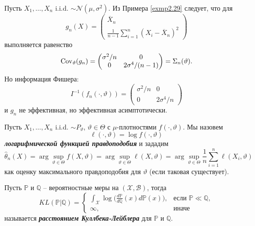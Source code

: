 \begin{exmp}
	Пусть $X_1, \dots, X_n$ i.i.d. $\sim \mathcal{N}(\mu, \sigma^2)$. Из Примера \ref{exmp2.29} следует, что для
	\[ g_n(X) = \begin{pmatrix}
	\overline{X}_n \\
	\frac{1}{n-1} \sum_{i=1}^{n} (X_i - \overline{X}_n)^2
	\end{pmatrix}  \]
	выполняется равенство
	\[ \mathrm{Cov}_\vartheta(g_n) = \begin{pmatrix}
	\sigma^2/n & 0 \\
	0 & 2\sigma^4 / (n - 1)
	\end{pmatrix}  
	= \Sigma_n(\vartheta). \]
	Но информация Фишера:
	\[ I^{-1}(f_n(\cdot, \vartheta)) = \begin{pmatrix}
	\sigma^2/n & 0 \\
	0 & 2\sigma^4 / n
	\end{pmatrix}   \]
	и $g_n$ не эффективная, но эффективная асимптотически.
\end{exmp}

\begin{rmrk}
	Пусть $X_1, \dots, X_n$ i.i.d. $\sim P_\vartheta$, $\vartheta \in \Theta$ с $\mu$-плотностями $f(\cdot, \vartheta)$. Мы назовем
	\[ \ell(\cdot, \vartheta) = \log f(\cdot, \vartheta)  \] 
	\textbf{\textit{логарифмической функцией правдоподобия}} и зададим
	\[ \hat{\theta}_n(X) = \arg \sup_{\vartheta \in \Theta} f(X, \vartheta) = \arg \sup_{\vartheta \in \Theta} \ell (X, \vartheta) = \arg \sup_{\vartheta \in \Theta} \frac{1}{n} \sum_{i=1}^{n} \ell (X_i, \vartheta) \]
	как оценку максимального правдоподобия для $\vartheta$ (если таковая существует).
\end{rmrk}

\begin{defn}
	Пусть $\mathbb{P}$ и $\mathbb{Q}$ -- вероятностные меры на $(\mathcal{X}, \mathcal{B})$, тогда
	\[ KL(\mathbb{P}|\mathbb{Q}) =
	\left \{
	\begin{array}{cl}
	\int_{\mathcal{X}} \log\Big(\frac{d\mathbb{P}}{d\mathbb{Q}}(x) d\mathbb{P}(x) \Big), & \text{если } \mathbb{P} \ll \mathbb{Q}, \\
	\infty, & \text{иначе}  
	\end{array}
	\right.
	\]
	называется \textbf{\textit{расстоянием Куллбека-Лейблера}} для $\mathbb{P}$ и $\mathbb{Q}$.
\end{defn}

